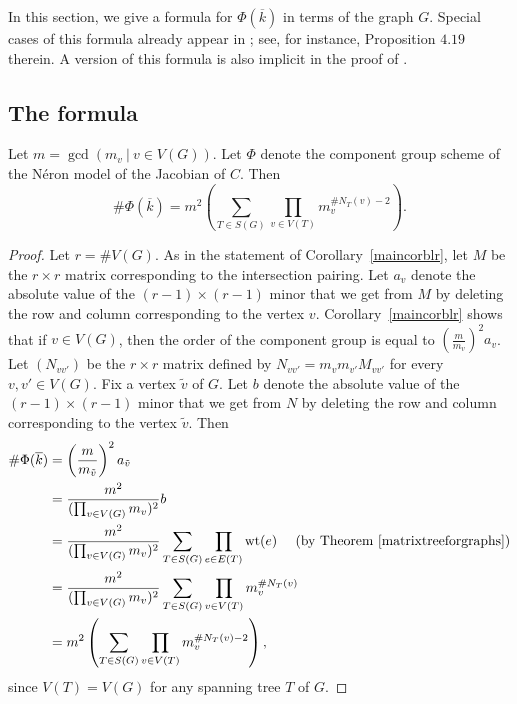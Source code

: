 In this section, we give a formula for $\Phi(\overline{k})$ in terms of the graph $G$. Special cases of this formula already appear in \cite{lor2}; see, for instance, Proposition $4.19$ therein. A version of this formula is also implicit in the proof of \cite[Corollary~3.5]{lor1}. 

\subsection{The formula}\label{raynaudsformula}

\begin{thm}\label{compformula}
Let $m = \gcd(m_v \ | \ v \in V(G))$. Let $\Phi$ denote the component group scheme of the N\'{e}ron model of the Jacobian of $C$. Then
 \begin{equation}\label{formula}
  \# \Phi(\overline{k}) = m^2 \left( \sum_{T \in S(G)} \prod_{v \in V(T)} m_{v}^{\# N_T(v)-2} \right) . 
 \end{equation} 
\end{thm}
\begin{proof}
Let $r = \# V(G)$. As in the statement of Corollary~\ref{maincorblr}, let $M$ be the $r \times r$ matrix corresponding to the intersection pairing. Let $a_v$ denote the absolute value of the $(r-1) \times (r-1)$ minor that we get from $M$ by deleting the row and column corresponding to the vertex $v$. Corollary~\ref{maincorblr} shows that if $v \in V(G)$, then the order of the component group is equal to $(\tfrac{m}{m_v})^2 a_v$. Let $(N_{vv'})$ be the $r \times r$ matrix defined by $N_{vv'} = m_v m_{v'} M_{vv'}$ for every $v,v' \in V(G)$. Fix a vertex $\tilde{v}$ of $G$. Let $b$ denote the absolute value of the $(r-1) \times (r-1)$ minor that we get from $N$ by deleting the row and column corresponding to the vertex $\tilde{v}$. Then
\begin{align*}
 \# \Phi(\overline{k}) &= \left( \frac{m}{m_{\tilde{v}}} \right)^2 a_{\tilde{v}} \\
 &= \frac{m^2}{(\prod_{v \in V(G)} m_{v})^2} b \\
 &=  \frac{m^2}{(\prod_{v \in V(G)} m_{v})^2}  \sum_{T \in S(G)} \prod_{e \in E(T)} \operatorname{wt}(e) \ \ \ \ (\textup{by Theorem}~\ref{matrixtreeforgraphs}) \\ 
 &=  \frac{m^2}{(\prod_{v \in V(G)} m_{v})^2}  \sum_{T \in S(G)} \prod_{v \in V(T)} m_{v}^{\# N_T(v)} \\
 &=  m^2 \left( \sum_{T \in S(G)} \prod_{v \in V(T)} m_{v}^{\# N_T(v)-2} \right), 
\end{align*}
since $V(T) = V(G)$ for any spanning tree $T$ of $G$.
\end{proof}

